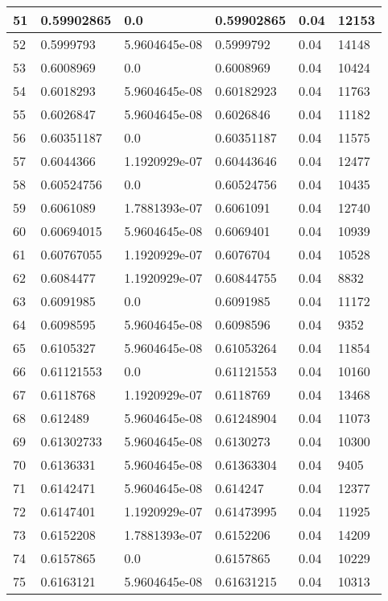 \begin{longtable}{|l|l|l|l|l|l|}
51 & 0.59902865 & 0.0 & 0.59902865 & 0.04 & 12153 \\ \hline 
52 & 0.5999793 & 5.9604645e-08 & 0.5999792 & 0.04 & 14148 \\ \hline 
53 & 0.6008969 & 0.0 & 0.6008969 & 0.04 & 10424 \\ \hline 
54 & 0.6018293 & 5.9604645e-08 & 0.60182923 & 0.04 & 11763 \\ \hline 
55 & 0.6026847 & 5.9604645e-08 & 0.6026846 & 0.04 & 11182 \\ \hline 
56 & 0.60351187 & 0.0 & 0.60351187 & 0.04 & 11575 \\ \hline 
57 & 0.6044366 & 1.1920929e-07 & 0.60443646 & 0.04 & 12477 \\ \hline 
58 & 0.60524756 & 0.0 & 0.60524756 & 0.04 & 10435 \\ \hline 
59 & 0.6061089 & 1.7881393e-07 & 0.6061091 & 0.04 & 12740 \\ \hline 
60 & 0.60694015 & 5.9604645e-08 & 0.6069401 & 0.04 & 10939 \\ \hline 
61 & 0.60767055 & 1.1920929e-07 & 0.6076704 & 0.04 & 10528 \\ \hline 
62 & 0.6084477 & 1.1920929e-07 & 0.60844755 & 0.04 & 8832 \\ \hline 
63 & 0.6091985 & 0.0 & 0.6091985 & 0.04 & 11172 \\ \hline 
64 & 0.6098595 & 5.9604645e-08 & 0.6098596 & 0.04 & 9352 \\ \hline 
65 & 0.6105327 & 5.9604645e-08 & 0.61053264 & 0.04 & 11854 \\ \hline 
66 & 0.61121553 & 0.0 & 0.61121553 & 0.04 & 10160 \\ \hline 
67 & 0.6118768 & 1.1920929e-07 & 0.6118769 & 0.04 & 13468 \\ \hline 
68 & 0.612489 & 5.9604645e-08 & 0.61248904 & 0.04 & 11073 \\ \hline 
69 & 0.61302733 & 5.9604645e-08 & 0.6130273 & 0.04 & 10300 \\ \hline 
70 & 0.6136331 & 5.9604645e-08 & 0.61363304 & 0.04 & 9405 \\ \hline 
71 & 0.6142471 & 5.9604645e-08 & 0.614247 & 0.04 & 12377 \\ \hline 
72 & 0.6147401 & 1.1920929e-07 & 0.61473995 & 0.04 & 11925 \\ \hline 
73 & 0.6152208 & 1.7881393e-07 & 0.6152206 & 0.04 & 14209 \\ \hline 
74 & 0.6157865 & 0.0 & 0.6157865 & 0.04 & 10229 \\ \hline 
75 & 0.6163121 & 5.9604645e-08 & 0.61631215 & 0.04 & 10313 \\ \hline 
\end{longtable}
